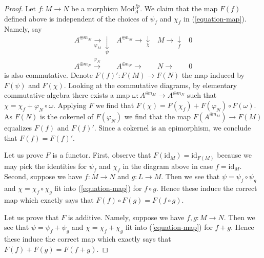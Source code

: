 \begin{proof}
\medskip\noindent
Let $f : M \to N$ be a morphism $\text{Mod}^{fp}_A$. We claim that the map
$F(f)$ defined above is independent of the choices of $\psi_f$ and $\chi_f$
in (\ref{equation-map}). Namely, say
$$
\begin{array}{cccc}A^{\oplus m_M} \underset{\varphi_M}{\longrightarrow}\underset{\psi}{\downarrow} & A^{\oplus n_M} \longrightarrow\underset{\chi}{\downarrow} & M \longrightarrow\underset{f}{\downarrow} & 0 \\ A^{\oplus m_N} \overset{\varphi_N}{\longrightarrow} & A^{\oplus n_N} \longrightarrow & N \longrightarrow & 0\end{array}
$$
is also commutative. Denote $F(f)' : F(M) \to F(N)$ the map
induced by $F(\psi)$ and $F(\chi)$. Looking at the commutative
diagrams, by elementary commutative algebra there exists a map
$\omega : A^{\oplus n_M} \to A^{\oplus m_N}$ such that
$\chi = \chi_f + \varphi_N \circ \omega$. Applying $F$ we
find that $F(\chi) = F(\chi_f) + F(\varphi_N) \circ F(\omega)$.
As $F(N)$ is the cokernel of $F(\varphi_N)$ we find
that the map $F(A^{\oplus n_M}) \to F(M)$ equalizes $F(f)$ and $F(f)'$.
Since a cokernel is an epimorphism, we conclude that $F(f) = F(f)'$.

\medskip\noindent
Let us prove $F$ is a functor. First, observe that
$F(\text{id}_M) = \text{id}_{F(M)}$ because we may pick
the identities for $\psi_f$ and $\chi_f$ in the diagram above
in case $f = \text{id}_M$. Second, suppose we have
$f : M \to N$ and $g : L \to M$. Then we see that
$\psi = \psi_f \circ \psi_g$ and $\chi = \chi_f \circ \chi_g$
fit into (\ref{equation-map}) for $f \circ g$.
Hence these induce the correct map which exactly
says that $F(f) \circ F(g) = F(f \circ g)$.

\medskip\noindent
Let us prove that $F$ is additive. Namely, suppose we have
$f, g : M \to N$. Then we see that $\psi = \psi_f + \psi_g$ and
$\chi = \chi_f + \chi_g$ fit into (\ref{equation-map}) for $f + g$.
Hence these induce the correct map which exactly
says that $F(f) + F(g) = F(f + g)$.


\end{proof}

